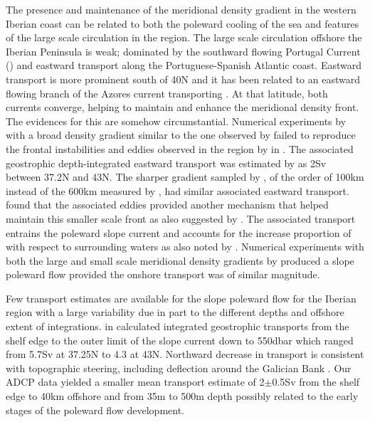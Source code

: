 The presence and maintenance of the meridional density gradient in
the western Iberian coast can be related to both the poleward
cooling of the sea and features of the large scale circulation in
the region. The large scale circulation offshore the Iberian
Peninsula is weak; dominated by the southward flowing Portugal
Current (\citep[Chapter~\ref{ch:litrev}][]{Saunders82}) and
eastward transport along the Portuguese-Spanish Atlantic coast.
Eastward transport is more prominent south of 40\deg N and it has
been related to an eastward flowing branch of the Azores current
\citep{Kase82,Pollard85} transporting \enawt \citep{Rios92}. At
that latitude, both currents converge, helping to maintain and
enhance the meridional density front. The evidences for this are
somehow circumstantial. Numerical experiments by \citet{Dubert98}
with a broad density gradient similar to the one observed by
\citet{Maze97} failed to reproduce the frontal instabilities and
eddies observed in the region by \citet{Vitorino95} in
\citet{Dubert98}. The associated geostrophic depth-integrated
eastward transport was estimated by \citet{Maze97} as 2Sv between
37.2\deg N and 43\deg N. The sharper gradient sampled by
\citet{Vitorino95}, of the order of 100km instead of the 600km
measured by \citet{Maze95}, had similar associated eastward
transport. \citet{Dubert98} found that the associated eddies
provided another mechanism that helped maintain this smaller scale
front as also suggested by \citet{Spall97}. The associated
transport entrains the poleward slope current and accounts for the
increase proportion of \enawt with respect to surrounding waters
as also noted by \citet{Frouin90}. Numerical experiments with both
the large and small scale meridional density gradients by
\citet{Dubert98} produced a slope poleward flow provided the
onshore transport was of similar magnitude.

Few transport estimates are available for the slope poleward flow
for the Iberian region with a large variability due in part to the
different depths and offshore extent of integrations.
\citet{Silva96} in \citet{Huthnance02} calculated integrated
geostrophic transports from the shelf edge to the outer limit of
the slope current down to 550dbar which ranged from 5.7Sv at
37.25\deg N to 4.3 at 43\deg N. Northward decrease in transport is
consistent with topographic steering, including deflection around
the Galician Bank \citep[see Fig.~\ref{fig:largebathy} for
location, ][]{Coelho02}. Our ADCP data yielded a smaller mean
transport estimate of 2$\pm$0.5Sv from the shelf edge to 40km
offshore and from 35m to 500m depth possibly related to the early
stages of the poleward flow development.


